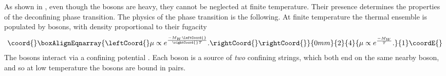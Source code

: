 \documentclass[a4paper,aps,prd,superscriptaddress,showpacs,showkeys]{revtex4}
\begin{document}
As shown in \cite{gg1}, even though the \coordHE{} bosons are heavy, they
cannot be neglected at finite temperature. Their presence determines the
properties of the deconfining phase transition. The physics of the phase
transition is the following. At finite temperature the thermal ensemble
is
populated by  \coordHE{} bosons, with density  proportional to their fugacity
\begin{eqnarray}\coord{}\boxAlignEqnarray{\leftCoord{}\mu\propto e^{-M_W\leftCoord{}\over\rightCoord{} T} .\rightCoord{}
\label{mu}
\rightCoord{}}{0mm}{2}{4}{\mu\propto e^{-M_W\over T} .
}{1}\coordE{}\end{eqnarray}The \coordHE{} bosons interact via a confining potential
\cite{Polyakov}.
Each
\coordHE{} boson is a source of {\it two} confining strings, which both end on
the same nearby \coordHE{} boson, and so at low temperature
the \coordHE{} bosons are bound in pairs.
\end{document}
